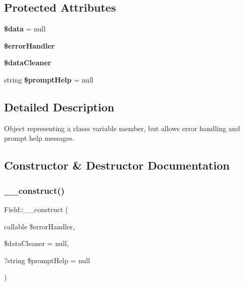 \subsection*{Protected Attributes}
\begin{DoxyCompactItemize}
\item 
\mbox{\label{classField_a4ef2767bbc9edafc28b43fcafc9cfc14}} 
{\bfseries \$data} = null
\item 
\mbox{\label{classField_ab99fddcf18839cfba9038b7ca5cb0505}} 
{\bfseries \$error\+Handler}
\item 
\mbox{\label{classField_af12f4a8d51558e1e41cfd7aaed5a5e5e}} 
{\bfseries \$data\+Cleaner}
\item 
\mbox{\label{classField_aec8b430e3b1f483094a122f89a657470}} 
string {\bfseries \$prompt\+Help} = null
\end{DoxyCompactItemize}


\subsection{Detailed Description}
Object representing a class\textquotesingle{}s variable member, but allows error handling and prompt help messages. 

\subsection{Constructor \& Destructor Documentation}
\mbox{\label{classField_a360a1d2e980c0168004a5e2d29505995}} 
\subsubsection{\texorpdfstring{\+\_\+\+\_\+construct()}{\_\_construct()}}
{\footnotesize\ttfamily Field\+::\+\_\+\+\_\+construct (\begin{DoxyParamCaption}\item[{callable}]{\$error\+Handler,  }\item[{}]{\$data\+Cleaner = {\ttfamily null},  }\item[{?string}]{\$prompt\+Help = {\ttfamily null} }\end{DoxyParamCaption})}



